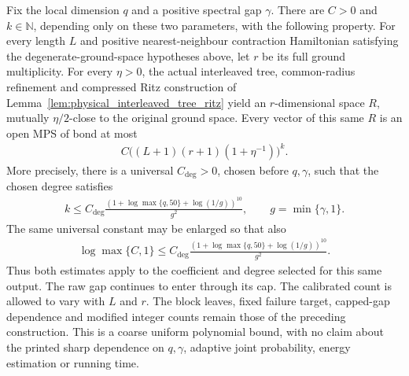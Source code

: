 \begin{corollary}
    \label{cor:physical_interleaved_ritz_polynomial}
    \leanok
    Fix the local dimension $q$ and a positive spectral gap $\gamma$.
    There are $C>0$ and $k\in\mathbb N$, depending only on these two
    parameters, with the following property. For every length $L$ and
    positive nearest-neighbour contraction Hamiltonian satisfying the
    degenerate-ground-space hypotheses above, let $r$ be its full ground
    multiplicity. For every $\eta>0$, the actual interleaved tree,
    common-radius refinement and compressed Ritz construction of
    Lemma~\ref{lem:physical_interleaved_tree_ritz} yield an $r$-dimensional
    space $R$, mutually $\eta/2$-close to the original ground space.
    Every vector of this same $R$ is an open MPS of bond at most
    \begin{align}
        C\bigl((L+1)(r+1)(1+\eta^{-1})\bigr)^k.
        \label{eq:interleaved_ritz_uniform_polynomial}
    \end{align}
    More precisely, there is a universal $C_{\deg}>0$, chosen before
    $q,\gamma$, such that the chosen degree satisfies
    \begin{align}
        k\le C_{\deg}\frac{
            (1+\log\max\{q,50\}+\log(1/g))^{10}}{g^2},
        \qquad g=\min\{\gamma,1\}.
        \label{eq:interleaved_ritz_gap_degree}
    \end{align}
    The same universal constant may be enlarged so that also
    \begin{align}
        \log\max\{C,1\}\le C_{\deg}\frac{
            (1+\log\max\{q,50\}+\log(1/g))^{10}}{g^2}.
        \label{eq:interleaved_ritz_log_coefficient}
    \end{align}
    Thus both estimates apply to the coefficient and degree selected for
    this same output. The raw gap continues to enter through its cap.
    The calibrated count is allowed to vary with $L$ and $r$.
    The block leaves, fixed failure target, capped-gap dependence and
    modified integer counts remain those of the preceding construction.
    This is a coarse uniform polynomial bound, with no claim about the
    printed sharp dependence on $q,\gamma$, adaptive joint probability,
    energy estimation or running time.
\end{corollary}
